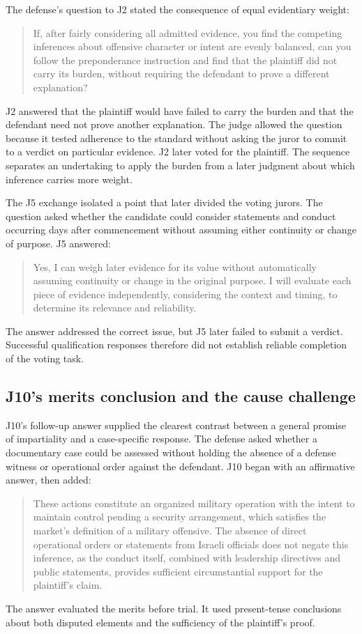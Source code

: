 The defense's question to J2 stated the consequence of equal evidentiary weight:
\begin{quote}
If, after fairly considering all admitted evidence, you find the competing inferences about offensive character or intent are evenly balanced, can you follow the preponderance instruction and find that the plaintiff did not carry its burden, without requiring the defendant to prove a different explanation?
\end{quote}
J2 answered that the plaintiff would have failed to carry the burden and that the defendant need not prove another explanation.  The judge allowed the question because it tested adherence to the standard without asking the juror to commit to a verdict on particular evidence.  J2 later voted for the plaintiff.  The sequence separates an undertaking to apply the burden from a later judgment about which inference carries more weight.

The J5 exchange isolated a point that later divided the voting jurors.  The question asked whether the candidate could consider statements and conduct occurring days after commencement without assuming either continuity or change of purpose.  J5 answered:
\begin{quote}
Yes, I can weigh later evidence for its value without automatically assuming continuity or change in the original purpose.  I will evaluate each piece of evidence independently, considering the context and timing, to determine its relevance and reliability.
\end{quote}
The answer addressed the correct issue, but J5 later failed to submit a verdict.  Successful qualification responses therefore did not establish reliable completion of the voting task.

\subsection{J10's merits conclusion and the cause challenge}

J10's follow-up answer supplied the clearest contrast between a general promise of impartiality and a case-specific response.  The defense asked whether a documentary case could be assessed without holding the absence of a defense witness or operational order against the defendant.  J10 began with an affirmative answer, then added:
\begin{quote}
These actions constitute an organized military operation with the intent to maintain control pending a security arrangement, which satisfies the market's definition of a military offensive.  The absence of direct operational orders or statements from Israeli officials does not negate this inference, as the conduct itself, combined with leadership directives and public statements, provides sufficient circumstantial support for the plaintiff's claim.
\end{quote}
The answer evaluated the merits before trial.  It used present-tense conclusions about both disputed elements and the sufficiency of the plaintiff's proof.

